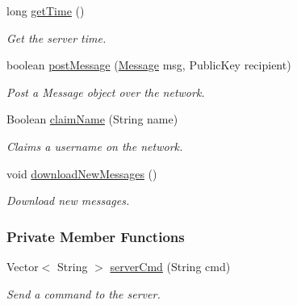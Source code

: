 \begin{DoxyCompactItemize}
long \hyperlink{classballmerpeak_1_1turtlenet_1_1server_1_1NetworkConnection_adc4c65f1c818d16a6abd8ace93bf0047}{get\-Time} ()
\begin{DoxyCompactList}\small\item\em Get the server time. \end{DoxyCompactList}\item 
boolean \hyperlink{classballmerpeak_1_1turtlenet_1_1server_1_1NetworkConnection_adde42c7caa6295080ba05a66f4bb9ad3}{post\-Message} (\hyperlink{classballmerpeak_1_1turtlenet_1_1shared_1_1Message}{Message} msg, Public\-Key recipient)
\begin{DoxyCompactList}\small\item\em Post a Message object over the network. \end{DoxyCompactList}\item 
Boolean \hyperlink{classballmerpeak_1_1turtlenet_1_1server_1_1NetworkConnection_a023c16ede7a0c0175e31a937823fbc8f}{claim\-Name} (String name)
\begin{DoxyCompactList}\small\item\em Claims a username on the network. \end{DoxyCompactList}\item 
void \hyperlink{classballmerpeak_1_1turtlenet_1_1server_1_1NetworkConnection_aa13cfceaafe089d920b79b877a5b810c}{download\-New\-Messages} ()
\begin{DoxyCompactList}\small\item\em Download new messages. \end{DoxyCompactList}\end{DoxyCompactItemize}
\subsubsection*{Private Member Functions}
\begin{DoxyCompactItemize}
\item 
Vector$<$ String $>$ \hyperlink{classballmerpeak_1_1turtlenet_1_1server_1_1NetworkConnection_a117a5b525dfb1a2e03ed10ce9adaed77}{server\-Cmd} (String cmd)
\begin{DoxyCompactList}\small\item\em Send a command to the server. \end{DoxyCompactList}\end{DoxyCompactItemize}
